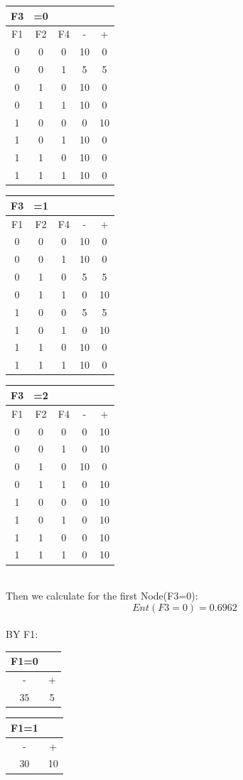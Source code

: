 \documentclass{article}
\begin{document}
\begin{tabular}{|ccc|cc|}
    F3&=0\\
    \hline
    F1&F2&F4&-&+\\
    \hline
    0&0&0&10&0\\
    0&0&1&5&5\\
    0&1&0&10&0\\
    0&1&1&10&0\\
    1&0&0&0&10\\
    1&0&1&10&0\\
    1&1&0&10&0\\
    1&1&1&10&0\\
    \hline
\end{tabular}
\begin{tabular}{|ccc|cc|}
    F3&=1\\
    \hline
    F1&F2&F4&-&+\\
    \hline
    0&0&0&10&0\\
    0&0&1&10&0\\
    0&1&0&5&5\\
    0&1&1&0&10\\
    1&0&0&5&5\\
    1&0&1&0&10\\
    1&1&0&10&0\\
    1&1&1&10&0\\
    \hline
\end{tabular}
\begin{tabular}{|ccc|cc|}
    F3&=2\\
    \hline
    F1&F2&F4&-&+\\
    \hline
    0&0&0&0&10\\
    0&0&1&0&10\\
    0&1&0&10&0\\
    0&1&1&0&10\\
    1&0&0&0&10\\
    1&0&1&0&10\\
    1&1&0&0&10\\
    1&1&1&0&10\\
    \hline
\end{tabular}\\
Then we calculate for the first Node(F3=0):\\
\[Ent(F3=0)=0.6962\]
\\BY F1:\\
\begin{center}
    \begin{tabular}{cc}
    F1=0\\
    \hline
    -&+\\
    \hline
    35&5\\
    \hline
\end{tabular}
\begin{tabular}{cc}
    F1=1\\
    \hline
    -&+\\
    \hline
    30&10\\
    \hline
\end{tabular}
\end{center}
\end{document}
